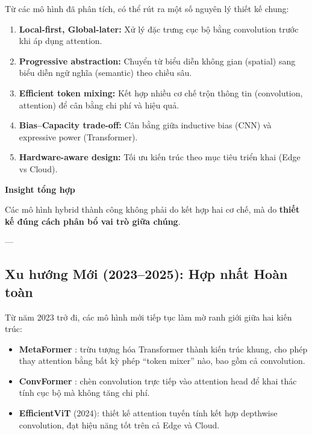 Từ các mô hình đã phân tích, có thể rút ra một số nguyên lý thiết kế chung:

\begin{enumerate}
	\item \textbf{Local-first, Global-later:}  
	Xử lý đặc trưng cục bộ bằng convolution trước khi áp dụng attention.
	
	\item \textbf{Progressive abstraction:}  
	Chuyển từ biểu diễn không gian (spatial) sang biểu diễn ngữ nghĩa (semantic) theo chiều sâu.
	
	\item \textbf{Efficient token mixing:}  
	Kết hợp nhiều cơ chế trộn thông tin (convolution, attention) để cân bằng chi phí và hiệu quả.
	
	\item \textbf{Bias–Capacity trade-off:}  
	Cân bằng giữa inductive bias (CNN) và expressive power (Transformer).
	
	\item \textbf{Hardware-aware design:}  
	Tối ưu kiến trúc theo mục tiêu triển khai (Edge vs Cloud).
\end{enumerate}

\begin{mdframed}[style=infobox]
	\textbf{Insight tổng hợp}
	
	Các mô hình hybrid thành công không phải do kết hợp hai cơ chế,  
	mà do \textbf{thiết kế đúng cách phân bổ vai trò giữa chúng}.
\end{mdframed}

---

\subsection{Xu hướng Mới (2023–2025): Hợp nhất Hoàn toàn}
\label{subsec:hybrid_trends}

Từ năm 2023 trở đi, các mô hình mới tiếp tục làm mờ ranh giới giữa hai kiến trúc:
\begin{itemize}
	\item \textbf{MetaFormer} \cite{Yu2022}: trừu tượng hóa Transformer thành kiến trúc khung, cho phép thay attention bằng bất kỳ phép “token mixer” nào, bao gồm cả convolution.
	\item \textbf{ConvFormer} \cite{Zhang2023}: chèn convolution trực tiếp vào attention head để khai thác tính cục bộ mà không tăng chi phí.
	\item \textbf{EfficientViT} (2024): thiết kế attention tuyến tính kết hợp depthwise convolution, đạt hiệu năng tốt trên cả Edge và Cloud.
\end{itemize}

